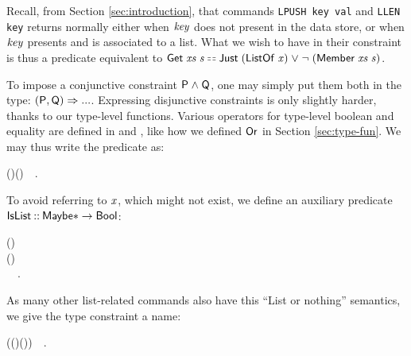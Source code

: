 Recall, from Section \ref{sec:introduction}, that commands \texttt{LPUSH key
val} and \texttt{LLEN key} returns normally either when \ensuremath{\Varid{key}} does not present
in the data store, or when \ensuremath{\Varid{key}} presents and is associated to a list.
What we wish to have in their constraint is thus a predicate equivalent to \ensuremath{\Conid{Get}\;\Varid{xs}\;\Varid{s}\doubleequals\Conid{Just}\;(\Conid{ListOf}\;\Varid{x})\mathrel{\vee}\neg \;(\Conid{Member}\;\Varid{xs}\;\Varid{s})}.

To impose a conjunctive constraint \ensuremath{\Conid{P}\mathrel{\wedge}\Conid{Q}}, one may simply put them both in the
type: \ensuremath{(\Conid{P},\Conid{Q})\Rightarrow \mathbin{...}}. Expressing disjunctive constraints is only slightly
harder, thanks to our type-level functions. Various operators for type-level
boolean and equality are defined in  and
, like how we defined \ensuremath{\Conid{Or}} in Section
\ref{sec:type-fun}. We may thus write the predicate as:
\begin{hscode}\SaveRestoreHook
{}%
%
\>[B]{}\;\;\doubleequals{}\;(\;)\;(\;\;)~~.{}\<[E]%
\ColumnHook
\end{hscode}\resethooks
To avoid referring to \ensuremath{\Varid{x}}, which might not exist, we define an auxiliary predicate \ensuremath{\Conid{IsList}\mathbin{::}\Conid{Maybe}\mathbin{*}\to \Conid{Bool}}:
\begin{hscode}\SaveRestoreHook
{}%
%
%
%
\>[B]{}\;\;\;(\mathbin{::}\mathbin{*})\mathbin{::}\;\<[E]%
\\
\>[B]{}\<[5]%
\>[5]{}\;(\;)\mathrel{=}\mbox{\textquotesingle}\<[E]%
\\
\>[B]{}\<[5]%
\>[5]{}\;\<[23]%
\>[23]{}\mathrel{=}\mbox{\textquotesingle}~~.{}\<[E]%
\ColumnHook
\end{hscode}\resethooks
As many other list-related commands also have this ``List or nothing'' semantics, we give the type constraint a name:
\begin{hscode}\SaveRestoreHook
{}%
%
\>[B]{}\;\;\mathrel{=}(\;(\;\;)\mathrel{\vee}\;(\;\;))\mathord{\sim}~~.{}\<[E]%
\ColumnHook
\end{hscode}\resethooks
